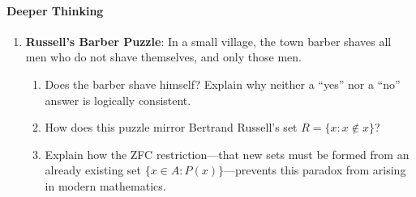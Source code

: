 \paragraph{Deeper Thinking}
\begin{enumerate}[resume]
\item \textbf{Russell's Barber Puzzle}: In a small village, the town barber shaves all men who do not shave themselves, and only those men. 
\begin{enumerate}[label=(\alph*)]
\item Does the barber shave himself? Explain why neither a ``yes'' nor a ``no'' answer is logically consistent.
\item How does this puzzle mirror Bertrand Russell's set $R = \{x : x \notin x\}$?
\item Explain how the ZFC restriction---that new sets must be formed from an already existing set $\{x \in A : P(x)\}$---prevents this paradox from arising in modern mathematics.
\end{enumerate}
\end{enumerate}

\newpage
